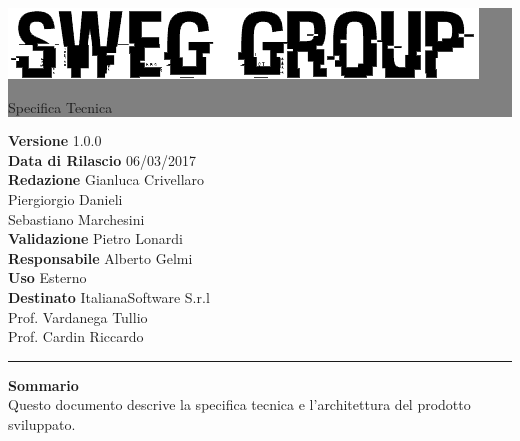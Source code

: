 \documentclass[12pt,a4paper,titlepage]{article}
\newcommand{\HRule}[1]{\hfill \rule{0.2\linewidth}{#1}} %
\begin{document}
	
	\thispagestyle{empty} %
	
	
	\colorbox{grey}{
		\parbox[t]{0.91\linewidth}{
			\centering \fontsize{50pt}{80pt}\selectfont %
			\vspace*{0.7cm} %
			
			\raggedleft
			\includegraphics[width=\linewidth]{../../LogoSWEgGroupSFONDOVUOTO}
			
			\hfill Specifica Tecnica \\
			
			\vspace*{0.7cm} %
		}
	}
	
	
	\vfill %
	
	
	{\centering \large 
		\hfill \textbf{Versione} 			1.0.0 \\		
		\hfill \textbf{Data di Rilascio}	06/03/2017 \\ 
		\hfill \textbf{Redazione} 			Gianluca Crivellaro \\
		\hfill								Piergiorgio Danieli \\
		\hfill								Sebastiano Marchesini \\
		\hfill \textbf{Validazione} 		Pietro Lonardi \\
		\hfill \textbf{Responsabile}		Alberto Gelmi \\
		\hfill \textbf{Uso} 				Esterno \\
		\hfill \textbf{Destinato} 			ItalianaSoftware S.r.l \\
		\hfill								Prof. Vardanega Tullio \\ 
		\hfill								Prof. Cardin Riccardo \\
		
		\HRule{1pt}
		
		\textbf{Sommario} \\
		Questo documento descrive la specifica tecnica e l'architettura del prodotto sviluppato.
		
	} %
	
\end{document}
